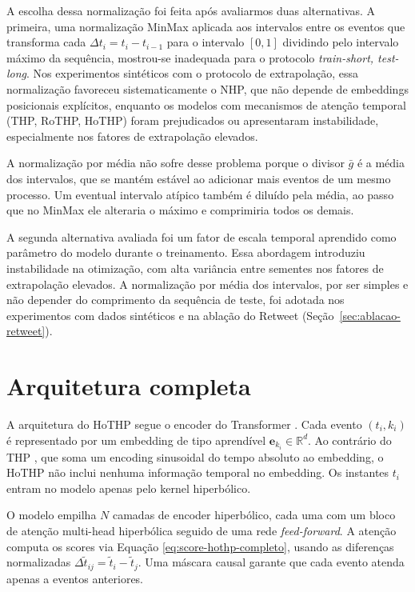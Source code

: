 A escolha dessa normalização foi feita após avaliarmos duas alternativas. A primeira, uma normalização MinMax aplicada aos intervalos entre os eventos que transforma cada $\Delta t_i = t_i - t_{i-1}$ para o intervalo $[0, 1]$ dividindo pelo intervalo máximo da sequência, mostrou-se inadequada para o protocolo \textit{train-short, test-long}. Nos experimentos sintéticos com o protocolo de extrapolação, essa normalização favoreceu sistematicamente o NHP, que não depende de embeddings posicionais explícitos, enquanto os modelos com mecanismos de atenção temporal (THP, RoTHP, HoTHP) foram prejudicados ou apresentaram instabilidade, especialmente nos fatores de extrapolação elevados.

A normalização por média não sofre desse problema porque o divisor $\bar{g}$ é a média dos intervalos, que se mantém estável ao adicionar mais eventos de um mesmo processo. Um eventual intervalo atípico também é diluído pela média, ao passo que no MinMax ele alteraria o máximo e comprimiria todos os demais.

A segunda alternativa avaliada foi um fator de escala temporal aprendido como parâmetro do modelo durante o treinamento. Essa abordagem introduziu instabilidade na otimização, com alta variância entre sementes nos fatores de extrapolação elevados. A normalização por média dos intervalos, por ser simples e não depender do comprimento da sequência de teste, foi adotada nos experimentos com dados sintéticos e na ablação do Retweet (Seção~\ref{sec:ablacao-retweet}).

\section{Arquitetura completa}
\label{sec:arquitetura-hothp}

A arquitetura do HoTHP segue o encoder do Transformer \cite{vaswani_attention_2017}. Cada evento $(t_i, k_i)$ é representado por um embedding de tipo aprendível $\mathbf{e}_{k_i} \in \mathbb{R}^d$. Ao contrário do THP \cite{zuo_transformer_2021}, que soma um encoding sinusoidal do tempo absoluto ao embedding, o HoTHP não inclui nenhuma informação temporal no embedding. Os instantes $t_i$ entram no modelo apenas pelo kernel hiperbólico.

O modelo empilha $N$ camadas de encoder hiperbólico, cada uma com um bloco de atenção multi-head hiperbólica seguido de uma rede \textit{feed-forward}. A atenção computa os scores via Equação \ref{eq:score-hothp-completo}, usando as diferenças normalizadas $\Delta\tilde{t}_{ij} = \tilde{t}_i - \tilde{t}_j$. Uma máscara causal garante que cada evento atenda apenas a eventos anteriores.

